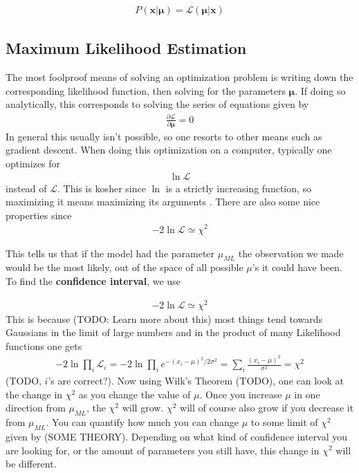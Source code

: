 \begin{align}
	P(\textbf{x}|\boldsymbol{\mu}) = \mathcal{L}(\boldsymbol{\mu}|\textbf{x})
\end{align}

\subsection{Maximum Likelihood Estimation}\label{sub:mle}
The most foolproof means of solving an optimization problem is writing down the corresponding likelihood function, then solving for the parameters $\boldsymbol{\mu}$. If doing so analytically, this corresponds to solving the series of equations given by
\begin{align}
\frac{\partial \mathcal{L}}{\partial \boldsymbol{\mu}} = 0
\end{align}
In general this usually isn't possible, so one resorts to other means such as gradient descent. When doing this optimization on a computer, typically one optimizes for
\begin{align}
	\ln\mathcal{L}
\end{align}
instead of $\mathcal{L}$. This is kosher since $\ln$ is a strictly increasing function, so maximizing it means maximizing its arguments \cite{burkov}. There are also some nice properties since 
\begin{align}
-2\ln\mathcal{L} \simeq \chi^2
\end{align}


This tells us that if the model had the parameter $\mu_{ML}$ the observation we made would be the most likely, out of the space of all possible $\mu$'s it could have been. To find the \textbf{confidence interval}, we use

\begin{align}
-2\ln\mathcal{L} \simeq \chi^2
\end{align}
This is because (TODO: Learn more about this) most things tend towards Gaussians in the limit of large numbers and in the product of many Likelihood functions one gets
\begin{align}
	-2\ln\prod_i\mathcal{L}_i = -2\ln\prod_i e^{-(x_i-\mu)^2/2\sigma^2} = \sum_i\frac{(x_i-\mu)^2}{\sigma^2} = \chi^2
\end{align}
(TODO, $i$'s are correct?). Now using Wilk's Theorem (TODO), one can look at the change in $\chi^2$ as you change the value of $\mu$. Once you increase $\mu$ in one direction from $\mu_{ML}$, the $\chi^2$ will grow. $\chi^2$ will of course also grow if you decrease it from $\mu_{ML}$. You can quantify how much you can change $\mu$ to some limit of $\chi^2$ given by (SOME THEORY). Depending on what kind of confidence interval you are looking for, or the amount of parameters you still have, this change in $\chi^2$ will be different. 


